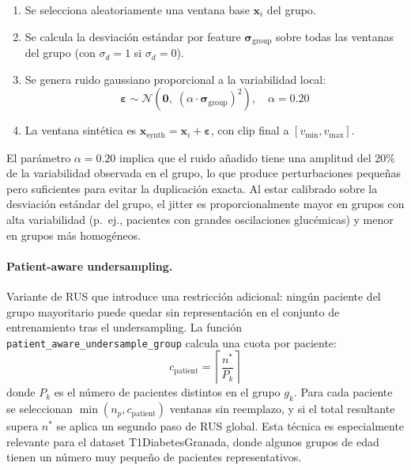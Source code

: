 \begin{enumerate}
  \item Se selecciona aleatoriamente una ventana base $\mathbf{x}_i$ del grupo.
  \item Se calcula la desviación estándar por feature $\boldsymbol{\sigma}_\text{group}$ sobre todas las ventanas del grupo (con $\sigma_d = 1$ si $\sigma_d = 0$).
  \item Se genera ruido gaussiano proporcional a la variabilidad local:
  \begin{equation}
    \boldsymbol{\varepsilon} \sim \mathcal{N}\!\left(\mathbf{0},\; (\alpha \cdot \boldsymbol{\sigma}_\text{group})^2\right), \quad \alpha = 0.20
    \label{eq:jitter_noise}
  \end{equation}
  \item La ventana sintética es $\mathbf{x}_\text{synth} = \mathbf{x}_i + \boldsymbol{\varepsilon}$, con clip final a $[v_\text{min}, v_\text{max}]$.
\end{enumerate}

El parámetro $\alpha = 0.20$ implica que el ruido añadido tiene una amplitud del 20\% de la variabilidad observada en el grupo, lo que produce perturbaciones pequeñas pero suficientes para evitar la duplicación exacta. Al estar calibrado sobre la desviación estándar del grupo, el jitter es proporcionalmente mayor en grupos con alta variabilidad (p.~ej., pacientes con grandes oscilaciones glucémicas) y menor en grupos más homogéneos.

\paragraph{Patient-aware undersampling.}
Variante de RUS que introduce una restricción adicional: ningún paciente del grupo mayoritario puede quedar sin representación en el conjunto de entrenamiento tras el undersampling. La función \texttt{patient\_aware\_undersample\_group} calcula una cuota por paciente:
\begin{equation}
  c_\text{patient} = \left\lceil \frac{n^*}{P_k} \right\rceil
  \label{eq:patient_cap}
\end{equation}
donde $P_k$ es el número de pacientes distintos en el grupo $g_k$. Para cada paciente se seleccionan $\min(n_p, c_\text{patient})$ ventanas sin reemplazo, y si el total resultante supera $n^*$ se aplica un segundo paso de RUS global. Esta técnica es especialmente relevante para el dataset T1DiabetesGranada, donde algunos grupos de edad tienen un número muy pequeño de pacientes representativos.


